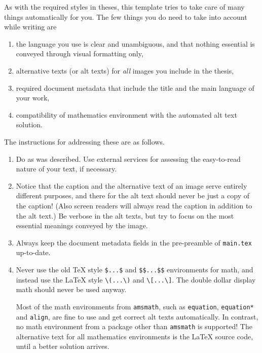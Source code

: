 As with the required styles in theses, this template tries to take care of many things automatically for you. The few things you do need to take into account while writing are
\begin{enumerate}
\item the language you use is clear and unambiguous, and that nothing essential is conveyed through visual formatting only,
\item alternative texts (or alt texts) for \emph{all} images you include in the thesis,
\item required document metadata that include the title and the main language of your work,
\item compatibility of mathematics environment with the automated alt text solution.
\end{enumerate}
The instructions for addressing these are as follows.
\begin{enumerate}
\item Do as was described. Use external services for assessing the easy-to-read nature of your text, if necessary.
\item Notice that the caption and the alternative text of an image serve entirely different purposes, and there for the alt text should never be just a copy of the caption! (Also screen readers will always read the caption in addition to the alt text.) Be verbose in the alt texts, but try to focus on the most essential meanings conveyed by the image.
\item Always keep the document metadata fields in the pre-preamble of \texttt{main.tex} up-to-date.
\item Never use the old \TeX{} style \verb+$...$+ and \verb+$$...$$+ environments for math, and instead use the \LaTeX{} style \verb+\(...\)+ and \verb+\[...\]+. The double dollar display math should never be used anyway.

Most of the math environments from \texttt{amsmath}, such as \texttt{equation}, \texttt{equation*} and \texttt{align}, are fine to use and get correct alt texts automatically. In contrast, no math environment from a package other than \texttt{amsmath} is supported! The alternative text for all mathematics environments is the \LaTeX{} source code, until a better solution arrives.
\end{enumerate}

